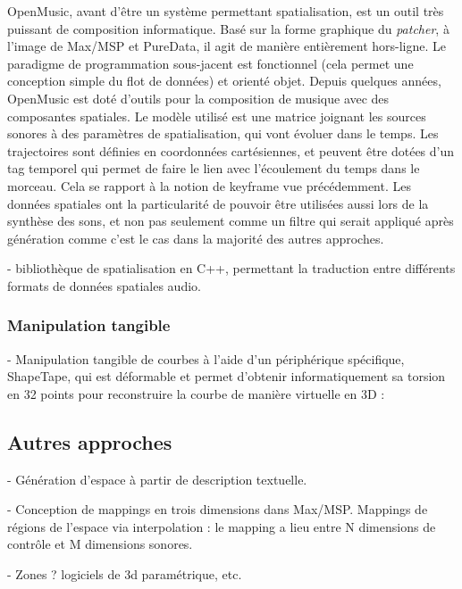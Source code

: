 \documentclass[french,12pt]{article}
\begin{document}
OpenMusic, avant d'être un système permettant spatialisation, est un outil très puissant de composition informatique. Basé sur la forme graphique du \textit{patcher}, à l'image de Max/MSP et PureData, il agit de manière entièrement hors-ligne. Le paradigme de programmation sous-jacent est fonctionnel (cela permet une conception simple du flot de données) et orienté objet.
Depuis quelques années, OpenMusic est doté d'outils pour la composition de musique avec des composantes spatiales\cite{bresson_spatial_2012}. Le modèle utilisé est une matrice joignant les sources sonores à des paramètres de spatialisation, qui vont évoluer dans le temps. 
Les trajectoires sont définies en coordonnées cartésiennes, et peuvent être dotées d'un tag temporel qui permet de faire le lien avec l'écoulement du temps dans le morceau. Cela se rapport à la notion de keyframe vue précédemment. Les données spatiales ont la particularité de pouvoir être utilisées aussi lors de la synthèse des sons, et non pas seulement comme un filtre qui serait appliqué après génération comme c'est le cas dans la majorité des autres approches.

- bibliothèque de spatialisation en C++, permettant la traduction entre différents formats de données spatiales audio.
\cite{wozniewski_spatosc:_2012}

\subsubsection{Manipulation tangible}
- Manipulation tangible de courbes à l'aide d'un périphérique spécifique, ShapeTape, qui est déformable 
et permet d'obtenir informatiquement sa torsion en 32 points pour reconstruire la courbe de manière virtuelle en 3D : 
\cite{grossman_interface_2003}

\subsection{Autres approches}
- Génération d'espace à partir de description textuelle.
\cite{andriamarozakaniaina_du_2012} 

- Conception de mappings en trois dimensions dans Max/MSP. 
Mappings de régions de l'espace via interpolation :
 le mapping a lieu entre N dimensions de contrôle et M dimensions sonores.
\cite{van_nort_lom_2006}

 - Zones ? logiciels de 3d paramétrique, etc. 

\newpage
\end{document}
